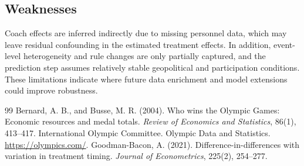 \documentclass{mcmthesis}
\begin{document}
\subsection{Weaknesses}
Coach effects are inferred indirectly due to missing personnel data, which may leave residual confounding in the estimated treatment effects. In addition, event-level heterogeneity and rule changes are only partially captured, and the prediction step assumes relatively stable geopolitical and participation conditions. These limitations indicate where future data enrichment and model extensions could improve robustness.

\begin{thebibliography}{99}
 Bernard, A. B., and Busse, M. R. (2004). Who wins the Olympic Games: Economic resources and medal totals. \textit{Review of Economics and Statistics}, 86(1), 413--417.
 International Olympic Committee. Olympic Data and Statistics. \url{https://olympics.com/}.
 Goodman-Bacon, A. (2021). Difference-in-differences with variation in treatment timing. \textit{Journal of Econometrics}, 225(2), 254--277.
\end{thebibliography}
\end{document}
